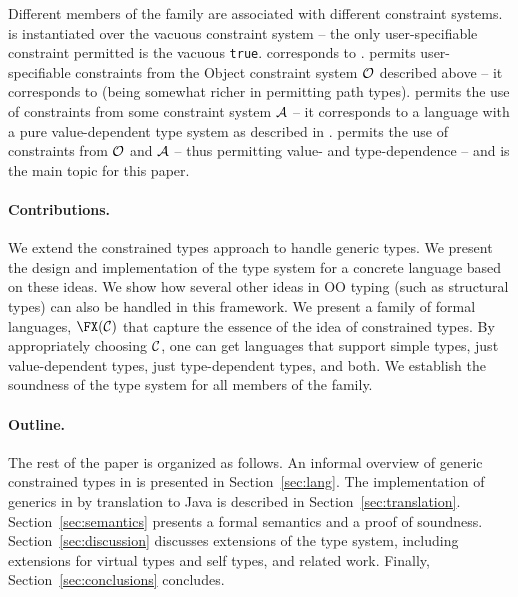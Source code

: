 Different members of the family are associated with different
constraint systems. \FXZ{} is
\FX{} instantiated over the vacuous constraint system -- the only
user-specifiable constraint permitted is the vacuous {\tt true}. \FXZ{}
corresponds to \FJ. \FXG{} permits user-specifiable constraints from the 
Object constraint system $\cal O$ described above -- it corresponds to
\FGJ{} (being somewhat richer in permitting path types). \FXD{} permits
the use of constraints from some constraint system $\cal A$ -- it
corresponds to a language with a pure value-dependent type system as
described in \cite{constrained-types}. \FXGD{} permits the use of constraints
from $\cal O$ and $\cal A$ -- thus permitting value- and
type-dependence -- and is the main topic for this paper.


\paragraph{Contributions.}
We extend the constrained types approach to handle generic types.  We
present the design and implementation of the type system for a
concrete language \Xten{} based on these ideas. We show how several
other ideas in OO typing (such as structural types) can also be
handled in this framework. We present a family of formal languages,
$\FX(\cal C)$ that capture the essence of the idea of constrained
types. By appropriately choosing $\cal C$, one can get languages that
support simple types, just value-dependent types, just type-dependent
types, and both. We establish the soundness of the type system for all
members of the family.

\paragraph{Outline.}

The rest of the paper is organized as follows.
%
An informal overview of generic constrained types in \Xten{}
is presented in
Section~\ref{sec:lang}.  The implementation of generics in \Xten{} by translation to Java is described in 
Section~\ref{sec:translation}.
%
Section~\ref{sec:semantics} presents a formal semantics and a
proof of soundness.
%
Section~\ref{sec:discussion} discusses extensions of the type system,
including extensions for virtual types and self types, and related work.
%
Finally, Section~\ref{sec:conclusions} concludes.


